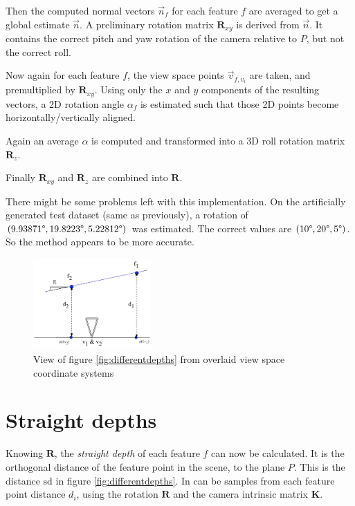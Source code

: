 \documentclass{scrreprt}
\newcommand{\matr}[1]{\mathbf{#1}}
\newcommand{\degr}{\text{\textdegree}}
\begin{document}
Then the computed normal vectors $\vec{n}_f$ for each feature $f$ are averaged to get a global estimate $\vec{n}$. A preliminary rotation matrix $\matr{R}_{xy}$ is derived from $\vec{n}$. It contains the correct pitch and yaw rotation of the camera relative to $P$, but not the correct roll.

Now again for each feature $f$, the view space points $\vec{v}_{f,v_i}$ are taken, and premultiplied by $\matr{R}_{xy}$. Using only the $x$ and $y$ components of the resulting vectors, a 2D rotation angle $\alpha_f$ is estimated such that those 2D points become horizontally/vertically aligned.

Again an average $\alpha$ is computed and transformed into a 3D roll rotation matrix $\matr{R}_z$.

Finally $\matr{R}_{xy}$ and $\matr{R}_z$ are combined into $\matr{R}$.

There might be some problems left with this implementation. On the artificially generated test dataset (same as previously), a rotation of $(9.93871\degr, 19.8223\degr, 5.22812\degr)$ was estimated. The correct values are $(10\degr, 20\degr, 5\degr)$. So the method appears to be more accurate.


\begin{figure}
\centering
\includegraphics[width=0.4\textwidth]{differentdepthsview.pdf}
\caption{View of figure \ref{fig:differentdepths} from overlaid view space coordinate systems}
\label{fig:differentdepthsview}
\end{figure}


\pagebreak

\section{Straight depths}
\label{ref:straightdepths}
Knowing $\matr{R}$, the \emph{straight depth} of each feature $f$ can now be calculated. It is the orthogonal distance of the feature point in the scene, to the plane $P$. This is the distance $\text{sd}$ in figure \ref{fig:differentdepths}. In can be samples from each feature point distance $d_i$, using the rotation $\matr{R}$ and the camera intrinsic matrix $\matr{K}$.
\end{document}
